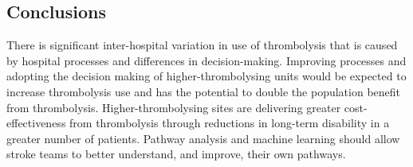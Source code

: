 \normalsize

\FloatBarrier

\subsection{Conclusions}

There is significant inter-hospital variation in use of thrombolysis that is caused by hospital processes and differences in decision-making. Improving processes and adopting the decision making of higher-thrombolysing units would be expected to increase thrombolysis use and has the potential to double the population benefit from thrombolysis. Higher-thrombolysing sites are delivering greater cost-effectiveness from thrombolysis through reductions in long-term disability in a greater number of patients.  Pathway analysis and machine learning should allow stroke teams to better understand, and improve, their own pathways.